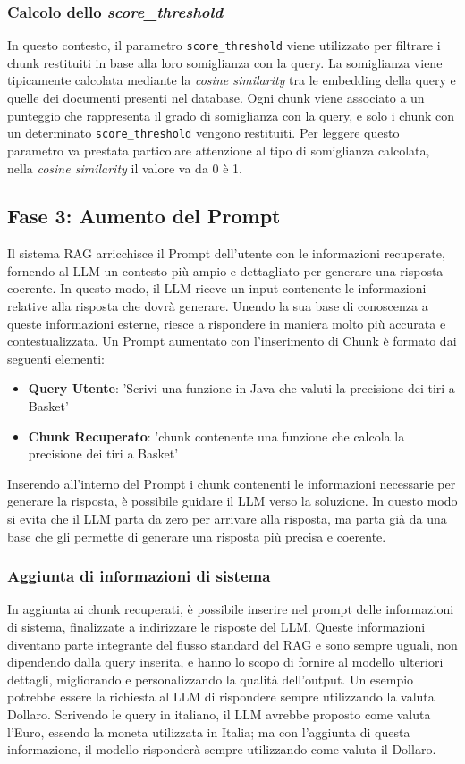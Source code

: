 \documentclass[12pt,a4paper,openright,twoside]{book}
\begin{document}
\subsubsection{Calcolo dello \emph{score\_threshold}}
In questo contesto, il parametro \texttt{score\_threshold} \cite{langchain-retriever-score-threshold} viene utilizzato per filtrare i chunk restituiti in base alla loro somiglianza con la query.
La somiglianza viene tipicamente calcolata mediante la \emph{cosine similarity} tra le embedding della query e quelle dei documenti presenti nel database.
Ogni chunk viene associato a un punteggio che rappresenta il grado di somiglianza con la query, e solo i chunk con un determinato \texttt{score\_threshold} vengono restituiti.
Per leggere questo parametro va prestata particolare attenzione al tipo di somiglianza calcolata,
nella \emph{cosine similarity} il valore va da 0 è 1.
\subsection{Fase 3: Aumento del Prompt}
Il sistema \ac{RAG} arricchisce il Prompt dell'utente con le informazioni recuperate, fornendo al \ac{LLM} un contesto più ampio e dettagliato per generare una risposta coerente. In questo modo, il \ac{LLM} riceve un input contenente le informazioni relative alla risposta che dovrà generare. Unendo la sua base di conoscenza a queste informazioni esterne, riesce a rispondere in maniera molto più accurata e contestualizzata. Un Prompt aumentato con l'inserimento di Chunk è formato dai seguenti elementi:
\begin{itemize}
    \item \textbf{Query Utente}: 'Scrivi una funzione in Java che valuti la precisione dei tiri a Basket'
    \item \textbf{Chunk Recuperato}: 'chunk contenente una funzione che calcola la precisione dei tiri a Basket'
\end{itemize}
Inserendo all'interno del Prompt i chunk contenenti le informazioni necessarie per generare la risposta, è possibile guidare il LLM verso la soluzione. In questo modo si evita che il LLM parta da zero per arrivare alla risposta, ma parta già da una base che gli permette di generare una risposta più precisa e coerente.

\subsubsection{Aggiunta di informazioni di sistema}
In aggiunta ai chunk recuperati, è possibile inserire nel prompt delle informazioni di sistema, finalizzate a indirizzare le risposte del \ac{LLM}. Queste informazioni diventano parte integrante del flusso standard del RAG e sono sempre uguali, non dipendendo dalla query inserita, e hanno lo scopo di fornire al modello ulteriori dettagli, migliorando e personalizzando la qualità dell'output. Un esempio potrebbe essere la richiesta al \ac{LLM} di rispondere sempre utilizzando la valuta Dollaro. Scrivendo le query in italiano, il \ac{LLM} avrebbe proposto come valuta l'Euro, essendo la moneta utilizzata in Italia; ma con l'aggiunta di questa informazione, il modello risponderà sempre utilizzando come valuta il Dollaro.
\end{document}
